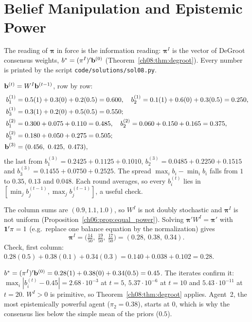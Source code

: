 \documentclass[../solutions_manual.tex]{subfiles}
\begin{document}
\ifSubfilesClassLoaded{\setcounter{chapter}{7}}{}%
\setcounter{chapter}{7}%
\chapter{Belief Manipulation and Epistemic Power}\label{sol08}

The reading of $\boldsymbol{\pi}$ in force is the information reading: $\boldsymbol{\pi}^I$ is the vector of DeGroot consensus weights, $b^* = (\pi^I)'\mathbf{b}^{(0)}$ (Theorem~\ref{ch08:thm:degroot}). Every number is printed by the script \nolinkurl{code/solutions/sol08.py}.


 $\mathbf{b}^{(t)} = W^I\mathbf{b}^{(t-1)}$, row by row:
\begin{align*}
b^{(1)}_1 &= 0.5(1) + 0.3(0) + 0.2(0.5) = 0.600, \quad b^{(1)}_2 = 0.1(1) + 0.6(0) + 0.3(0.5) = 0.250,\\
b^{(1)}_3 &= 0.3(1) + 0.2(0) + 0.5(0.5) = 0.550;\\
b^{(2)}_1 &= 0.300 + 0.075 + 0.110 = 0.485, \quad b^{(2)}_2 = 0.060 + 0.150 + 0.165 = 0.375,\\
b^{(2)}_3 &= 0.180 + 0.050 + 0.275 = 0.505;\\
\mathbf{b}^{(3)} &= (0.456,\ 0.425,\ 0.473),
\end{align*}
the last from $b^{(3)}_1 = 0.2425 + 0.1125 + 0.1010$, $b^{(3)}_2 = 0.0485 + 0.2250 + 0.1515$ and $b^{(3)}_3 = 0.1455 + 0.0750 + 0.2525$.
The spread $\max_i b_i - \min_i b_i$ falls from $1$ to $0.35$, $0.13$ and $0.048$. Each round averages, so every $b_i^{(t)}$ lies in $[\min_j b^{(t-1)}_j, \max_j b^{(t-1)}_j]$, a useful check.

 The column sums are $(0.9, 1.1, 1.0)$, so $W^I$ is not doubly stochastic and $\boldsymbol{\pi}^I$ is not uniform (Proposition~\ref{ch06:prop:equal_power}). Solving $\boldsymbol{\pi}'W^I = \boldsymbol{\pi}'$ with $\mathbf{1}'\pi = 1$ (e.g.\ replace one balance equation by the normalization) gives
\[
\boldsymbol{\pi}^I = \bigl(\tfrac{14}{50},\ \tfrac{19}{50},\ \tfrac{17}{50}\bigr) = (0.28,\ 0.38,\ 0.34).
\]
Check, first column: $0.28(0.5) + 0.38(0.1) + 0.34(0.3) = 0.140 + 0.038 + 0.102 = 0.28$.

 $b^* = (\pi^I)'\mathbf{b}^{(0)} = 0.28(1) + 0.38(0) + 0.34(0.5) = 0.45$. The iterates confirm it: $\max_i|b^{(t)}_i - 0.45| = 2.68\cdot10^{-3}$ at $t = 5$, $5.37\cdot10^{-6}$ at $t = 10$ and $5.43\cdot10^{-11}$ at $t = 20$. $W^I > 0$ is primitive, so Theorem~\ref{ch08:thm:degroot} applies. Agent~2, the most epistemically powerful agent ($\pi_2 = 0.38$), starts at $0$, which is why the consensus lies below the simple mean of the priors ($0.5$).
\end{document}
